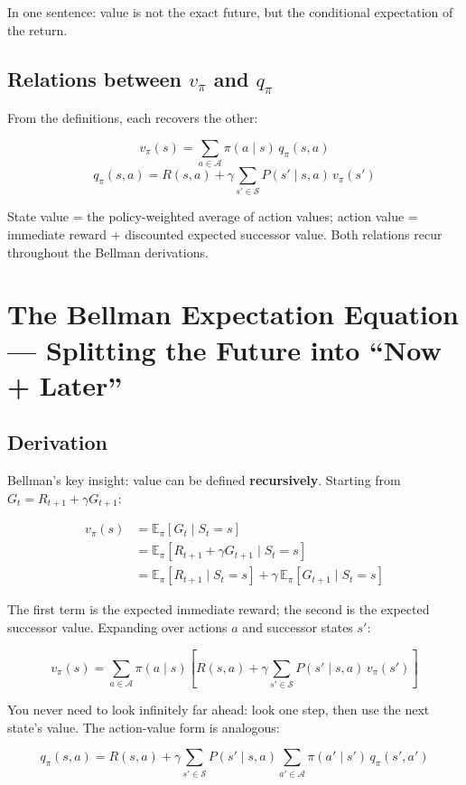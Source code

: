 \documentclass{article}
\begin{document}
In one sentence: value is not the exact future, but the conditional expectation of the return.

\subsection*{Relations between $v_\pi$ and $q_\pi$}

From the definitions, each recovers the other:

\[
v_\pi(s) = \sum_{a\in\mathcal{A}} \pi(a\mid s)\, q_\pi(s,a)
\]
\[
q_\pi(s,a) = R(s,a) + \gamma \sum_{s'\in\mathcal{S}} P(s'\mid s,a)\, v_\pi(s')
\]

State value = the policy-weighted average of action values; action value = immediate reward + discounted expected successor value. Both relations recur throughout the Bellman derivations.

\section*{The Bellman Expectation Equation --- Splitting the Future into ``Now + Later''}

\subsection*{Derivation}

Bellman's key insight: value can be defined \textbf{recursively}. Starting from $G_t = R_{t+1} + \gamma G_{t+1}$:

\[
\begin{aligned}
v_\pi(s) &= \mathbb{E}_\pi[G_t \mid S_t=s] \\
&= \mathbb{E}_\pi[R_{t+1} + \gamma G_{t+1} \mid S_t=s] \\
&= \mathbb{E}_\pi[R_{t+1}\mid S_t=s] + \gamma\,\mathbb{E}_\pi[G_{t+1}\mid S_t=s]
\end{aligned}
\]

The first term is the expected immediate reward; the second is the expected successor value. Expanding over actions $a$ and successor states $s'$:

\[
\boxed{v_\pi(s) = \sum_{a\in\mathcal{A}} \pi(a\mid s) \left[ R(s,a) + \gamma \sum_{s'\in\mathcal{S}} P(s'\mid s,a)\, v_\pi(s') \right]}
\]

You never need to look infinitely far ahead: look one step, then use the next state's value. The action-value form is analogous:

\[
q_\pi(s,a) = R(s,a) + \gamma \sum_{s'\in\mathcal{S}} P(s'\mid s,a) \sum_{a'\in\mathcal{A}} \pi(a'\mid s')\, q_\pi(s',a')
\]
\end{document}
